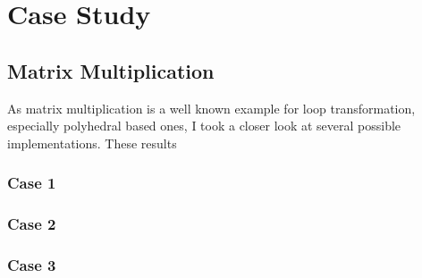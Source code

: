 
\chapter{Case Study} %
\label{Chapter6}

\section{Matrix Multiplication}

As matrix multiplication is a well known example for loop transformation,
especially polyhedral based ones, I took a closer look at several possible 
implementations. These results 

\subsection{Case 1}
\subsection{Case 2}
\subsection{Case 3}

